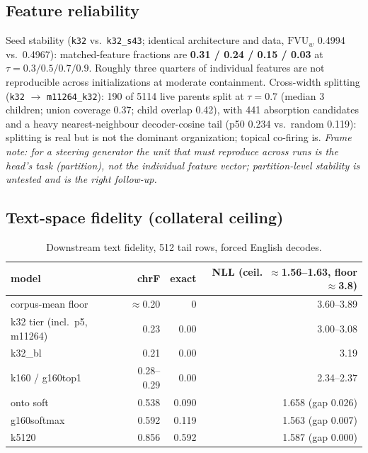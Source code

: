 \documentclass[11pt]{article}
\newcommand{\fvu}{\mathrm{FVU}_w}
\begin{document}
\subsection{Feature reliability}

Seed stability (\texttt{k32} vs.\ \texttt{k32\_s43}; identical
architecture and data, $\fvu$ 0.4994 vs.\ 0.4967): matched-feature
fractions are \textbf{0.31 / 0.24 / 0.15 / 0.03} at
$\tau = 0.3/0.5/0.7/0.9$. Roughly three quarters of individual features
are not reproducible across initializations at moderate containment.
Cross-width splitting (\texttt{k32} $\to$ \texttt{m11264\_k32}): 190 of
5114 live parents split at $\tau{=}0.7$ (median 3 children; union
coverage 0.37; child overlap 0.42), with 441 absorption candidates and a
heavy nearest-neighbour decoder-cosine tail (p50 0.234 vs.\ random
0.119): splitting is real but is not the dominant organization; topical
co-firing is. \emph{Frame note: for a steering generator the unit that
must reproduce across runs is the head's task (partition), not the
individual feature vector; partition-level stability is untested and is
the right follow-up.}

\subsection{Text-space fidelity (collateral ceiling)}

\begin{table}[h]\centering\small
\begin{tabular}{@{}lrrr@{}}
\toprule
model & chrF & exact & NLL (ceil.\ $\approx$1.56--1.63, floor $\approx$3.8) \\
\midrule
corpus-mean floor & $\approx$0.20 & 0 & 3.60--3.89 \\
k32 tier (incl.\ p5, m11264) & 0.23 & 0.00 & 3.00--3.08 \\
k32\_bl          & 0.21 & 0.00 & 3.19 \\
k160 / g160top1  & 0.28--0.29 & 0.00 & 2.34--2.37 \\
onto soft        & 0.538 & 0.090 & 1.658 (gap 0.026) \\
g160softmax      & 0.592 & 0.119 & 1.563 (gap 0.007) \\
k5120            & 0.856 & 0.592 & 1.587 (gap 0.000) \\
\bottomrule
\end{tabular}
\caption{Downstream text fidelity, 512 tail rows, forced English decodes.}
\end{table}
\end{document}
